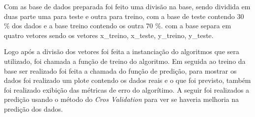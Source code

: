 Com as base de dados preparada foi feito uma divisão na base, sendo dividida em duas parte uma para teste e outra para treino, com a base de teste contendo 30 \% dos dados e a base treino contendo os outra 70 \%. com a base separa em quatro vetores sendo os vetores x\_treino, x\_teste, y\_treino, y\_teste.

Logo após a divisão dos vetores foi feita a instanciação do algoritmos que sera utilizado, foi chamada a função de treino do algoritmo. Em seguida ao treino da base ser realizado foi feita a chamada do função de predição, para mostrar os dados foi realizado um plote contendo os dados reais e o que foi previsto, também foi realizado exibição das métricas de erro do algorítimo. A seguir foi realizados a predição usando o método do \textit{Cros Validation} para ver se haveria melhoria na predição dos dados. 



